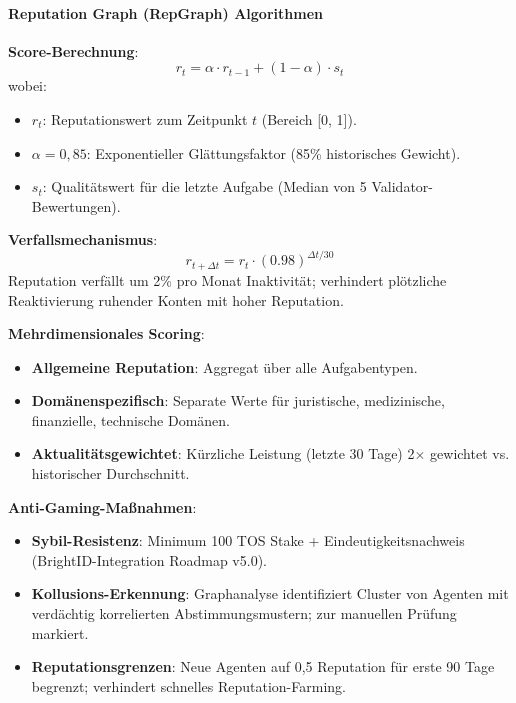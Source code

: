 \documentclass[11pt]{article}
\begin{document}
\paragraph{Reputation Graph (RepGraph) Algorithmen}

\textbf{Score-Berechnung}:
\begin{equation}
r_t = \alpha \cdot r_{t-1} + (1 - \alpha) \cdot s_t
\end{equation}
wobei:
\begin{itemize}[noitemsep]
  \item $r_t$: Reputationswert zum Zeitpunkt $t$ (Bereich [0, 1]).
  \item $\alpha = 0,85$: Exponentieller Glättungsfaktor (85\% historisches Gewicht).
  \item $s_t$: Qualitätswert für die letzte Aufgabe (Median von 5 Validator-Bewertungen).
\end{itemize}

\textbf{Verfallsmechanismus}:
\begin{equation}
r_{t+\Delta t} = r_t \cdot (0.98)^{\Delta t / 30}
\end{equation}
Reputation verfällt um 2\% pro Monat Inaktivität; verhindert plötzliche Reaktivierung ruhender Konten mit hoher Reputation.

\textbf{Mehrdimensionales Scoring}:
\begin{itemize}[noitemsep]
  \item \textbf{Allgemeine Reputation}: Aggregat über alle Aufgabentypen.
  \item \textbf{Domänenspezifisch}: Separate Werte für juristische, medizinische, finanzielle, technische Domänen.
  \item \textbf{Aktualitätsgewichtet}: Kürzliche Leistung (letzte 30 Tage) 2$\times$ gewichtet vs. historischer Durchschnitt.
\end{itemize}

\textbf{Anti-Gaming-Maßnahmen}:
\begin{itemize}[noitemsep]
  \item \textbf{Sybil-Resistenz}: Minimum 100 TOS Stake + Eindeutigkeitsnachweis (BrightID-Integration Roadmap v5.0).
  \item \textbf{Kollusions-Erkennung}: Graphanalyse identifiziert Cluster von Agenten mit verdächtig korrelierten Abstimmungsmustern; zur manuellen Prüfung markiert.
  \item \textbf{Reputationsgrenzen}: Neue Agenten auf 0,5 Reputation für erste 90 Tage begrenzt; verhindert schnelles Reputation-Farming.
\end{itemize}
\end{document}
